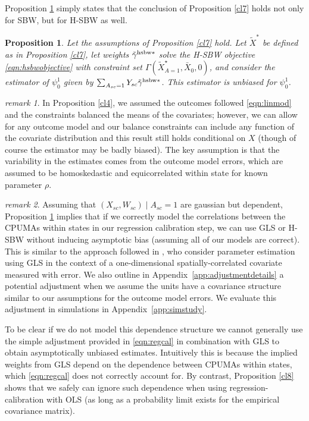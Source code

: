 \documentclass[aoas]{imsart}
\theoremstyle{plain}
\newtheorem{proposition}{Proposition}
\theoremstyle{remark}
\newtheorem{remark}{remark}
\begin{document}
\begin{appendix}
Proposition \ref{cl7hsbw} simply states that the conclusion of Proposition \ref{cl7} holds not only for SBW, but for H-SBW as well.

\begin{proposition}\label{cl7hsbw}
    Let the assumptions of Proposition \ref{cl7} hold. Let $\tilde{X}^*$ be defined as in Proposition \ref{cl7}, let weights $\tilde{\gamma}^{\textup{hsbw}*}$ solve the H-SBW objective \eqref{eqn:hsbwobjective} with constraint set $\Gamma(\tilde{X}^\star_{A=1}, \bar{X}_0, 0)$, and consider the estimator of $\psi_0^1$ given by $\sum_{A_{sc}=1} Y_{sc} \tilde{\gamma}^{\textup{hsbw}*}$. This estimator is unbiased for $\psi_0^1$.
\end{proposition}

\begin{remark}
    In Proposition \ref{cl4}, we assumed the outcomes followed \eqref{eqn:linmod} and the constraints balanced the means of the covariates; however, we can allow for any outcome model and our balance constraints can include any function of the covariate distribution and this result still holds conditional on $X$ (though of course the estimator may be badly biased). The key assumption is that the variability in the estimates comes from the outcome model errors, which are assumed to be homoskedastic and equicorrelated within state for known parameter $\rho$.
\end{remark}

\begin{remark}\label{remark:obgls}
    Assuming that $(X_{sc}, W_{sc}) \mid A_{sc} = 1$ are gaussian but dependent, Proposition \ref{cl7hsbw} implies that if we correctly model the correlations between the CPUMAs within states in our regression calibration step, we can use GLS or H-SBW without inducing asymptotic bias (assuming all of our models are correct). This is similar to the approach followed in \cite{huque2014impact}, who consider parameter estimation using GLS in the context of a one-dimensional spatially-correlated covariate measured with error. We also outline in Appendix~\ref{app:adjustmentdetails} a potential adjustment when we assume the units have a covariance structure similar to our assumptions for the outcome model errors. We evaluate this adjustment in simulations in Appendix~\ref{app:simstudy}. 
    
    To be clear if we do not model this dependence structure we cannot generally use the simple adjustment provided in \eqref{eqn:regcal} in combination with GLS to obtain asymptotically unbiased estimates. Intuitively this is because the implied weights from GLS depend on the dependence between CPUMAs within states, which \eqref{eqn:regcal} does not correctly account for. By contrast, Proposition \ref{cl8} shows that we safely can ignore such dependence when using regression-calibration with OLS (as long as a probability limit exists for the empirical covariance matrix).
\end{remark}


\end{appendix}
\end{document}
